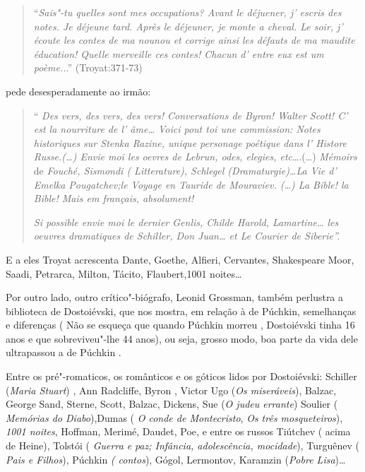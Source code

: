 \begin{quote}
``\emph{Sais"-tu quelles sont mes occupations? Avant le déjuener, j'
escris des notes. Je déjeune tard. Après le déjeuner, je monte a cheval.
Le soir, j' écoute les contes de ma nounou et corrige ainsi les défauts
de ma maudite éducation! Quelle merveille ces contes! Chacun d' entre
eux est um poème..}.'' (Troyat:371-73)
\end{quote}

pede desesperadamente ao irmão:

\begin{quote}
`` \emph{Des vers, des vers, des vers! Conversations de Byron! Walter
Scott! C' est la nourriture de l' âme\ldots{} Voici pout toi une
commission: Notes historiques sur Stenka Razine, unique personage
poétique dans l' Histore Russe.(\ldots{}) Envie moi les oevres de
Lebrun, odes, elegies, etc}\ldots{}.(\ldots{}) \emph{Mémoirs} de
\emph{Fouché, Sismondi ( Litterature), Schlegel (Dramaturgie)\ldots{}La Vie
d' Emelka Pougatchev;le Voyage en Tauride de Mouraviev. (\ldots{}) La Bible!
la Bible! Mais em français, absolument!}

\emph{Si possible envie moi le dernier Genlis, Childe Harold,
Lamartine\ldots{} les oeuvres dramatiques de Schiller, Don Juan\ldots{} et Le
Courier de Siberie''.}
\end{quote}

E a eles Troyat acrescenta Dante, Goethe, Alfieri, Cervantes,
Shakespeare Moor, Saadi, Petrarca, Milton, Tácito, Flaubert,1001
noites\ldots{}

Por outro lado, outro crítico"-biógrafo, Leonid Grossman, também
perlustra a biblioteca de Dostoiévski, que nos mostra, em relação à de
Púchkin, semelhanças e diferenças ( Não se esqueça que quando Púchkin
morreu , Dostoiévski tinha 16 anos e que sobreviveu"-lhe 44 anos), ou
seja, grosso modo, boa parte da vida dele ultrapassou a de Púchkin .

Entre os pré"-romaticos, os românticos e os góticos lidos por
Dostoiévski: Schiller (\emph{Maria Stuart}) , Ann Radcliffe, Byron ,
Victor Ugo (\emph{Os miseráveis}), Balzac, George Sand, Sterne, Scott,
Balzac, Dickens, Sue (\emph{O judeu errante}) Soulier ( \emph{Memórias
do Diabo}),Dumas ( \emph{O conde de Montecristo}, \emph{Os três
mosqueteiros}), \emph{1001 noites}, Hoffman, Merimé, Daudet, Poe, e
entre os russos Tiútchev ( acima de Heine), Tolstói ( \emph{Guerra e}
\emph{paz; Infância, adolescência, mocidade}), Turguênev ( \emph{Pais e
Filhos}), Púchkin \emph{( contos}), Gógol, Lermontov, Karamzin
(\emph{Pobre Lisa})\ldots{}

